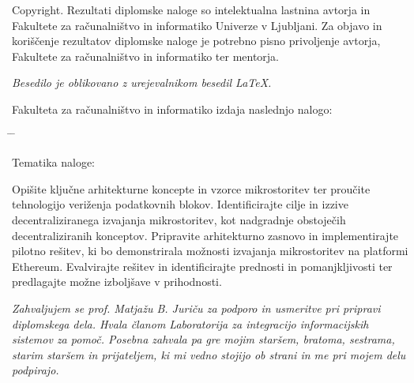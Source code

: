 \documentclass[a4paper, 12pt]{book}
\newcommand{\clearemptydoublepage}{\newpage{\pagestyle{empty}\cleardoublepage}}
\begin{document}
\noindent
{\sc Copyright}. 
Rezultati diplomske naloge so intelektualna lastnina avtorja in Fakultete za računalništvo in informatiko Univerze v Ljubljani.
Za objavo in koriščenje rezultatov diplomske naloge je potrebno pisno privoljenje avtorja, Fakultete za računalništvo in informatiko ter mentorja.

\begin{center}
\mbox{}\vfill
\emph{Besedilo je oblikovano z urejevalnikom besedil \LaTeX.}
\end{center}
\clearemptydoublepage

\thispagestyle{empty}
\vspace*{4cm}

\noindent
Fakulteta za računalništvo in informatiko izdaja naslednjo nalogo:
\medskip
\begin{tabbing}
\hspace{32mm}\= \hspace{6cm} \= \kill




Tematika naloge:
\end{tabbing}
Opišite ključne arhitekturne koncepte in vzorce mikrostoritev ter proučite tehnologijo veriženja podatkovnih blokov. Identificirajte cilje in izzive decentraliziranega izvajanja mikrostoritev, kot nadgradnje obstoječih decentraliziranih konceptov. Pripravite arhitekturno zasnovo in implementirajte pilotno rešitev, ki bo demonstrirala možnosti izvajanja mikrostoritev na platformi Ethereum. Evalvirajte rešitev in identificirajte prednosti in pomanjkljivosti ter predlagajte možne izboljšave v prihodnosti. 
\vspace{15mm}



\vspace{2cm}

\clearemptydoublepage

\thispagestyle{empty}\mbox{}\vfill\null\it%
\noindent
Zahvaljujem se prof. Matjažu B. Juriču za podporo in usmeritve pri pripravi diplomskega dela. Hvala članom Laboratorija za integracijo informacijskih sistemov za pomoč. Posebna zahvala pa gre mojim staršem, bratoma, sestrama, starim staršem in prijateljem, ki mi vedno stojijo ob strani in me pri mojem delu podpirajo.
\rm\normalfont

\clearemptydoublepage

\end{document}
